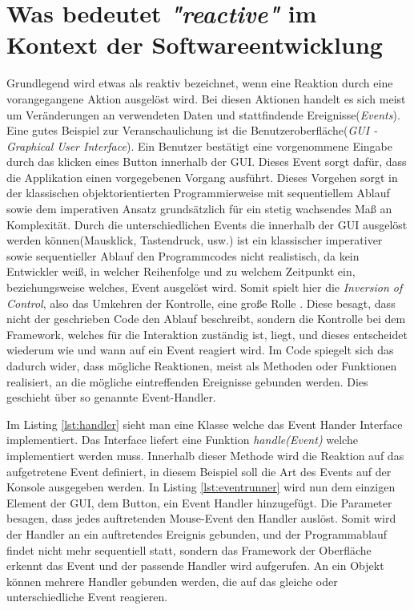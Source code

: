 \chapter{Was bedeutet \textit{"reactive"} im Kontext der Softwareentwicklung}\label{was_ist_reactive_programming}
Grundlegend wird etwas als reaktiv bezeichnet, wenn eine Reaktion durch eine vorangegangene Aktion ausgelöst wird. Bei diesen Aktionen handelt es sich meist um Veränderungen an verwendeten Daten und stattfindende Ereignisse(\textit{Events}). Eine gutes Beispiel zur Veranschaulichung ist die Benutzeroberfläche(\textit{GUI - Graphical User Interface}). Ein Benutzer bestätigt eine vorgenommene Eingabe durch das klicken eines Button innerhalb der GUI. Dieses Event sorgt dafür, dass die Applikation einen vorgegebenen Vorgang ausführt. Dieses Vorgehen sorgt in der klassischen objektorientierten Programmierweise mit sequentiellem Ablauf sowie dem imperativen Ansatz grundsätzlich für ein stetig wachsendes Maß an Komplexität. Durch die unterschiedlichen Events die innerhalb der GUI ausgelöst werden können(Mausklick, Tastendruck, usw.) ist ein klassischer imperativer sowie sequentieller Ablauf den Programmcodes nicht realistisch, da kein Entwickler weiß, in welcher Reihenfolge und zu welchem Zeitpunkt ein, beziehungsweise welches, Event ausgelöst wird. Somit spielt hier die \textit{Inversion of Control}, also das Umkehren der Kontrolle, eine große Rolle \cite{MartinFowler.2005}. Diese besagt, dass nicht der geschrieben Code den Ablauf beschreibt, sondern die Kontrolle bei dem Framework, welches für die Interaktion zuständig ist, liegt, und dieses entscheidet wiederum wie und wann auf ein Event reagiert wird. Im Code spiegelt sich das dadurch wider, dass mögliche Reaktionen, meist als Methoden oder Funktionen realisiert, an die mögliche eintreffenden Ereignisse gebunden werden. Dies geschieht über so genannte Event-Handler. 



Im Listing \ref{lst:handler} sieht man eine Klasse welche das Event Hander Interface implementiert. Das Interface liefert eine Funktion \textit{handle(Event)} welche implementiert werden muss. Innerhalb dieser Methode wird die Reaktion auf das aufgetretene Event definiert, in diesem Beispiel soll die Art des Events auf der Konsole ausgegeben werden. In Listing \ref{lst:eventrunner} wird nun dem einzigen Element der GUI, dem Button, ein Event Handler hinzugefügt. Die Parameter besagen, dass jedes auftretenden Mouse-Event den Handler auslöst. Somit wird der Handler an ein auftretendes Ereignis gebunden, und der Programmablauf findet nicht mehr sequentiell statt, sondern das Framework der Oberfläche erkennt das Event und der passende Handler wird aufgerufen. An ein Objekt können mehrere Handler gebunden werden, die auf das gleiche oder unterschiedliche Event reagieren.

